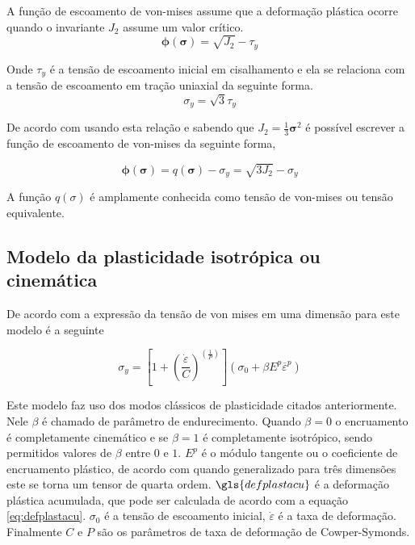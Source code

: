 A função de escoamento de von-mises assume que a deformação plástica ocorre quando o invariante $ J_2 $ assume um valor crítico.
\begin{equation} \label{eq:vonesc}
    \boldsymbol{\phi}(\boldsymbol{\sigma}) = \sqrt{J_2} - \tau_y
\end{equation}

Onde $ \tau_y $ é a tensão de escoamento inicial em cisalhamento e ela se relaciona com a tensão de escoamento em tração uniaxial da seguinte forma.
\begin{equation}
    \sigma_y = \sqrt{3}\tau_y
\end{equation}

De acordo com \cite{neto_peric_owens_2008} usando esta relação e sabendo que 
$ J_2 = \frac{1}{3}\boldsymbol{\sigma}^2 $
é possível escrever a função de escoamento de von-mises da seguinte forma,


\begin{equation} \label{eq:vonesc}
    \boldsymbol{\phi}(\boldsymbol{\sigma}) = q(\boldsymbol{\sigma}) - \sigma_y = \sqrt{3 J_2} - \sigma_y
\end{equation}

 A função  $ q(\sigma) $ é amplamente conhecida como tensão de von-mises ou tensão equivalente.
 
 \subsection{Modelo da plasticidade isotrópica ou cinemática}

De acordo com \cite{rao_narayanamurthy_simha_2016} a expressão da tensão de von mises em uma dimensão para este modelo é a seguinte 

\begin{equation}
    \sigma_y = \left[1 + (\frac{\dot{\varepsilon}}{C})^{(\frac{1}{P})} \right](\sigma_0 + \beta E^p \overline{\varepsilon}^p)
\end{equation}

Este modelo faz uso dos modos clássicos de plasticidade citados anteriormente. Nele $ \beta $ é chamado de parâmetro de endurecimento. Quando $ \beta = 0 $ o encruamento é completamente cinemático e se $ \beta = 1 $ é completamente isotrópico, sendo permitidos valores de $ \beta $ entre $0$ e $1$. $ E^p $ é o módulo tangente ou o coeficiente de encruamento plástico, de acordo com \cite{neto_peric_owens_2008} quando generalizado para três dimensões
este se torna um tensor de quarta ordem. $\gls{defplastacu}$ é a deformação plástica acumulada, que pode ser calculada de acordo com a equação \ref{eq:defplastacu}. $ \sigma_0 $ é a tensão de escoamento inicial, $\dot{\varepsilon} $ é a taxa de deformação. Finalmente $ C $ e $ P $ são os parâmetros de taxa de deformação de Cowper-Symonds. \par 

